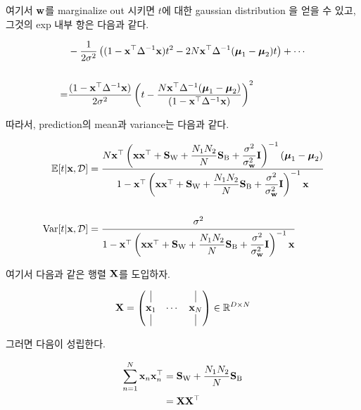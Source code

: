 \documentclass{article} %
\begin{document}
여기서 ${\bf w}$를 marginalize out 시키면 $t$에 대한 gaussian distribution 을 얻을 수 있고, 그것의 exp 내부 항은 다음과 같다.

\begin{equation}
\begin{aligned}
	&-\frac{1}{2 \sigma^2} \left(
		(1 - {\bf x}^\top \Delta^{-1} {\bf x})t^2 - 2N {\bf x}^\top \Delta ^{-1} (\boldsymbol{\mu}_1 - \boldsymbol{\mu}_2)t
	\right) + \cdots
	\\\\
	=& \frac{(1 - {\bf x}^\top \Delta^{-1} {\bf x})}{2\sigma^2} \left(
		t - \frac{N{\bf x}^\top \Delta^{-1} (\boldsymbol{\mu}_1 - \boldsymbol{\mu}_2)}{(1 - {\bf x}^\top \Delta^{-1} {\bf x})}
	\right)^2
\end{aligned}
\end{equation}

따라서, prediction의 mean과 variance는 다음과 같다.

\begin{equation}
\begin{aligned}
	\mathbb{E}[t | {\bf x}, {\cal D}] &= \cfrac{N {\bf x}^\top \left( {\bf x}{\bf x}^\top + {\bf S}_{\rm W} + \dfrac{N_1 N_2}{N} {\bf S}_{\rm B} + \dfrac{\sigma^2}{\sigma^2_{\bf w}} {\bf I}\right)^{-1}(\boldsymbol{\mu}_1 - \boldsymbol{\mu}_2)}{1 - {\bf x}^\top \left( {\bf x}{\bf x}^\top + {\bf S}_{\rm W} + \dfrac{N_1 N_2}{N} {\bf S}_{\rm B} + \dfrac{\sigma^2}{\sigma^2_{\bf w}} {\bf I}  \right)^{-1} {\bf x}}
	\\\\
	{\rm Var}[t | {\bf x}, {\cal D}] &= \cfrac{\sigma^2}{1 - {\bf x}^\top \left( {\bf x}{\bf x}^\top + {\bf S}_{\rm W} + \dfrac{N_1 N_2}{N} {\bf S}_{\rm B} + \dfrac{\sigma^2}{\sigma^2_{\bf w}} {\bf I}  \right)^{-1} {\bf x}}
\end{aligned}
\label{eq:evar}
\end{equation}

여기서 다음과 같은 행렬 ${\bf X}$를 도입하자.

\begin{equation}
	{\bf X} = \begin{pmatrix}
		\vrule & & \vrule \\
		{\bf x}_1 & \cdots & {\bf x}_N \\
		\vrule & & \vrule
	\end{pmatrix} \in \mathbb{R}^{D \times N}
\end{equation}

그러면 다음이 성립한다.

\begin{equation}
\begin{aligned}
	\sum_{n=1}^N {\bf x}_n {\bf x}_n^\top &= {\bf S}_{\rm W} + \frac{N_1 N_2}{N} {\bf S}_{\rm B}  \\
	&= {\bf X}{\bf X}^\top
\end{aligned}
\end{equation}
\end{document}
